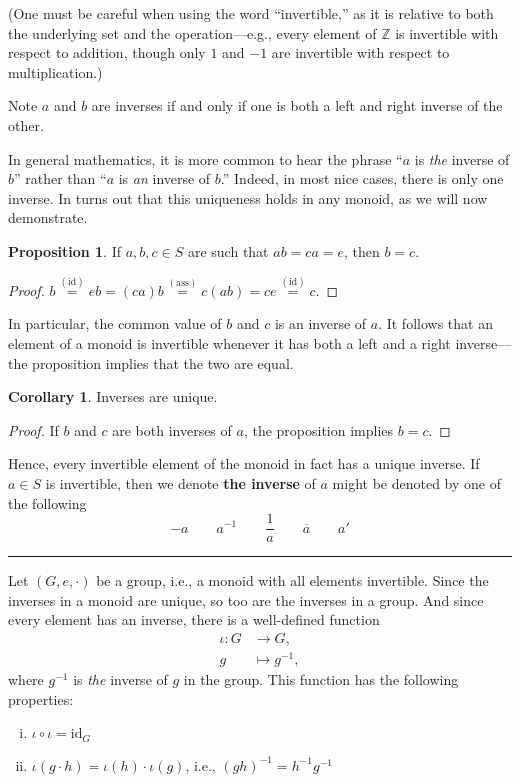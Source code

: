 \documentclass[12pt]{article}
\newcommand{\keyword}[1]{\textbf{#1}}
\newcommand{\sepline}{\rule{\textwidth}{0.4pt}}
\theoremstyle{definition}
\newtheorem{corollary}{Corollary}
\newtheorem{proposition}{Proposition}
\newcommand{\Z}{\mathbb{Z}}
\newcommand{\<}{\left\langle}
\renewcommand{\>}{\right\rangle}
\newcommand{\To}{\longrightarrow}
\newcommand{\Mapsto}{\longmapsto}
\newcommand{\eqby}[1]{\overset{\mathrm{(#1)}}{=}}
\newcommand{\id}{\mathrm{id}}
\renewcommand{\_}[1]{{_{#1}}}
\begin{document}
(One must be careful when using the word ``invertible,'' as it is relative to both the underlying set and the operation---e.g., every element of $\Z$ is invertible with respect to addition, though only $1$ and $-1$ are invertible with respect to multiplication.)

Note $a$ and $b$ are inverses if and only if one is both a left and right inverse of the other.

In general mathematics, it is more common to hear the phrase ``$a$ is \textit{the} inverse of $b$'' rather than ``$a$ is \textit{an} inverse of $b$.''
Indeed, in most nice cases, there is only one inverse.
In turns out that this uniqueness holds in any monoid, as we will now demonstrate.

\begin{proposition}
    If $a, b, c \in S$ are such that $ab = ca = e$, then $b = c$.
\end{proposition}

\begin{proof}
    $b \eqby{id} eb = (ca)b \eqby{ass} c(ab) = ce \eqby{id} c$.
\end{proof}

In particular, the common value of $b$ and $c$ is an inverse of $a$.
It follows that an element of a monoid is invertible whenever it has both a left and a right inverse---the proposition implies that the two are equal.

\begin{corollary}
    Inverses are unique.
\end{corollary}

\begin{proof}
    If $b$ and $c$ are both inverses of $a$, the proposition implies $b = c$.
\end{proof}

Hence, every invertible element of the monoid in fact has a unique inverse.
If $a \in S$ is invertible, then we denote \keyword{the inverse} of $a$ might be denoted by one of the following
\[
    -a \qquad a^{-1} \qquad \frac{1}{a} \qquad \overline{a} \qquad a'
\]

\sepline

Let $(G, e, \cdot)$ be a group, i.e., a monoid with all elements invertible.
Since the inverses in a monoid are unique, so too are the inverses in a group.
And since every element has an inverse, there is a well-defined function 
\begin{align*}
    \iota : G &\To G, \\
        g &\Mapsto g^{-1},
\end{align*}
where $g^{-1}$ is \textit{the} inverse of $g$ in the group.
This function has the following properties:
\begin{enumerate}[(i)]
    \item $\iota \circ \iota = \id_G$
    \item $\iota(g \cdot h) = \iota(h) \cdot \iota(g)$, i.e., $(gh)^{-1} = h^{-1}g^{-1}$
\end{enumerate}
\end{document}
